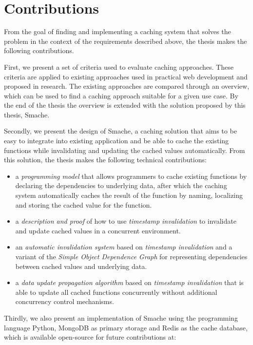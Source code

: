 

\section{Contributions}
\label{sec:contributions}

From the goal of finding and implementing a caching system that solves the problem in the context of the requirements described above, the thesis makes the following contributions.

First, we present a set of criteria used to evaluate caching approaches. These criteria are applied to existing approaches used in practical web development and proposed in research. The existing approaches are compared through an overview, which can be used to find a caching approach suitable for a given use case. By the end of the thesis the overview is extended with the solution proposed by this thesis, Smache.

Secondly, we present the design of Smache, a caching solution that aims to be easy to integrate into existing application and be able to cache the existing functions while invalidating and updating the cached values automatically. From this solution, the thesis makes the following technical contributions:

\begin{itemize}
  \item a \emph{programming model} that allows programmers to cache existing functions by declaring the dependencies to underlying data, after which the caching system automatically caches the result of the function by naming, localizing and storing the cached value for the function.
  \item a \emph{description and proof} of how to use \emph{timestamp invalidation} to invalidate and update cached values in a concurrent environment.
  \item an \emph{automatic invalidation system} based on \emph{timestamp invalidation} and a variant of the \emph{Simple Object Dependence Graph} for representing dependencies between cached values and underlying data.
  \item a \emph{data update propagation algorithm} based on \emph{timestamp invalidation} that is able to update all cached functions concurrently without additional concurrency control mechanisms.
\end{itemize}

Thirdly, we also present an implementation of Smache using the programming language Python, MongoDB as primary storage and Redis as the cache database, which is available open-source for future contributions at:

